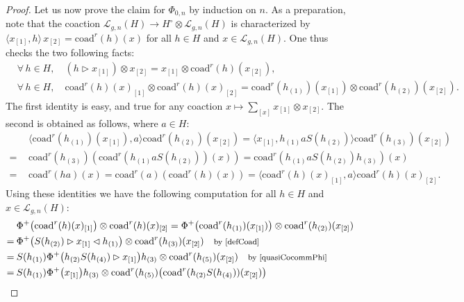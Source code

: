 \documentclass[11pt]{amsart}
\begin{document}
\begin{proof}
Let us now prove the claim for $\Phi_{0,n}$ by induction on $n$. As a preparation, note that the coaction $\mathcal{L}_{g,n}(H) \to H^\circ \otimes \mathcal{L}_{g,n}(H)$ is characterized by $\langle x_{[1]}, h \rangle \, x_{[2]} = \mathrm{coad}^r(h)(x)$ for all $h \in H$ and $x \in \mathcal{L}_{g,n}(H)$. One thus checks the two following facts:
\begin{align*}
&\forall \, h \in H, \quad (h \rhd x_{[1]}) \otimes x_{[2]} = x_{[1]} \otimes \mathrm{coad}^r(h)(x_{[2]}),\\
&\forall \, h \in H, \quad \mathrm{coad}^r(h)(x)_{[1]} \otimes \mathrm{coad}^r(h)(x)_{[2]} = \mathrm{coad}^r(h_{(1)})(x_{[1]}) \otimes \mathrm{coad}^r(h_{(2)})(x_{[2]}).
\end{align*}
The first identity is easy, and true for any coaction $\textstyle x\mapsto \sum_{[x]} x_{[1]}\otimes x_{[2]}$. The second is obtained as follows, where $a\in H$:
\begin{align*}
&\langle \mathrm{coad}^r(h_{(1)})(x_{[1]}) ,a\rangle \mathrm{coad}^r(h_{(2)})(x_{[2]})  = \langle x_{[1]} , h_{(1)}aS(h_{(2)})\rangle \mathrm{coad}^r(h_{(3)})(x_{[2]})\\
 =\:\,& \mathrm{coad}^r(h_{(3)})(\mathrm{coad}^r(h_{(1)}aS(h_{(2)}))(x)) = \mathrm{coad}^r(h_{(1)}aS(h_{(2)})h_{(3)})(x)\\
 =\:\,& \mathrm{coad}^r(ha)(x) = \mathrm{coad}^r(a)(\mathrm{coad}^r(h)(x)) = \langle \mathrm{coad}^r(h)(x)_{[1]} ,a\rangle \mathrm{coad}^r(h)(x)_{[2]}.
\end{align*}
Using these identities we have the following computation for all $h \in H$ and $x \in \mathcal{L}_{g,n}(H)$:
\begin{align}
\begin{split}\label{trucTechniquePreparation}
&\Phi^+\bigl( \mathrm{coad}^r(h)(x)_{[1]} \bigr) \otimes \mathrm{coad}^r(h)(x)_{[2]} = \Phi^+\bigl( \mathrm{coad}^r(h_{(1)})(x_{[1]}) \bigr) \otimes \mathrm{coad}^r(h_{(2)})(x_{[2]})\\
=\:&\Phi^+\bigl( S(h_{(2)}) \rhd x_{[1]} \lhd h_{(1)} \bigr) \otimes \mathrm{coad}^r(h_{(3)})(x_{[2]}) \quad \text{\footnotesize by \eqref{defCoad}}\\
=\:& S(h_{(1)})\Phi^+\bigl( h_{(2)}S(h_{(4)}) \rhd x_{[1]} \bigr) h_{(3)} \otimes \mathrm{coad}^r(h_{(5)})(x_{[2]}) \quad \text{\footnotesize by \eqref{quasiCocommPhi}}\\
=\:&S(h_{(1)})\Phi^+\bigl( x_{[1]} \bigr) h_{(3)} \otimes \mathrm{coad}^r(h_{(5)})\bigl( \mathrm{coad}^r(h_{(2)}S(h_{(4)}))(x_{[2]}) \bigr)\\

\end{split}
\end{align}
\end{proof}
\end{document}
